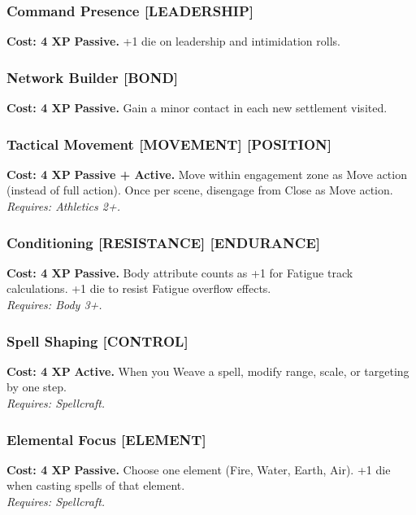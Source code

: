 \subsubsection*{Command Presence \textnormal{[LEADERSHIP]}}
\label{talent:command-presence}
\textbf{Cost: 4 XP} \textbf{Passive.} +1 die on leadership and intimidation rolls.

\subsubsection*{Network Builder \textnormal{[BOND]}}
\label{talent:network-builder}
\textbf{Cost: 4 XP} \textbf{Passive.} Gain a minor contact in each new settlement visited.

\subsubsection*{Tactical Movement \textnormal{[MOVEMENT] [POSITION]}}
\label{talent:tactical-movement}
\textbf{Cost: 4 XP} \textbf{Passive + Active.} Move within engagement zone as Move action (instead of full action). Once per scene, disengage from Close as Move action. \\
\textit{Requires: Athletics 2+.}

\subsubsection*{Conditioning \textnormal{[RESISTANCE] [ENDURANCE]}}
\label{talent:conditioning}
\textbf{Cost: 4 XP} \textbf{Passive.} Body attribute counts as +1 for Fatigue track calculations. +1 die to resist Fatigue overflow effects. \\
\textit{Requires: Body 3+.}

\subsubsection*{Spell Shaping \textnormal{[CONTROL]}}
\label{talent:spell-shaping}
\textbf{Cost: 4 XP} \textbf{Active.} When you Weave a spell, modify range, scale, or targeting by one step. \\
\textit{Requires: Spellcraft.}

\subsubsection*{Elemental Focus \textnormal{[ELEMENT]}}
\label{talent:elemental-focus}
\textbf{Cost: 4 XP} \textbf{Passive.} Choose one element (Fire, Water, Earth, Air). +1 die when casting spells of that element. \\
\textit{Requires: Spellcraft.}

